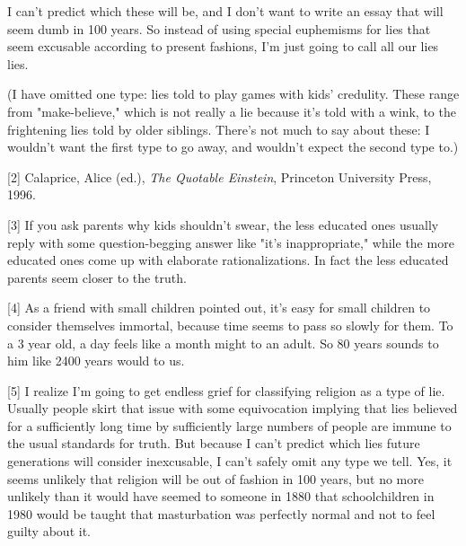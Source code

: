 I can't predict which these
                  will be, and I don't want to write an essay that will seem
                  dumb in 100 years. So instead of using special euphemisms for
                  lies that seem excusable according to present fashions, I'm
                  just going to call all our lies lies.

(I have
                  omitted one type: lies told to play games with kids'
                  credulity. These range from "make-believe," which is not
                  really a lie because it's told with a wink, to the frightening
                  lies told by older siblings. There's not much to say about
                  these: I wouldn't want the first type to go away, and wouldn't
                  expect the second type to.)

[2] Calaprice, Alice (ed.), \emph{The Quotable Einstein},
                  Princeton University Press, 1996.

[3] If you ask parents why kids shouldn't swear, the less
                  educated ones usually reply with some question-begging answer
                  like "it's inappropriate," while the more educated ones come
                  up with elaborate rationalizations. In fact the less educated
                  parents seem closer to the truth.

[4] As a friend with small children pointed out, it's easy for
                  small children to consider themselves immortal, because time
                  seems to pass so slowly for them. To a 3 year old, a day feels
                  like a month might to an adult. So 80 years sounds to him like
                  2400 years would to us.

[5] I realize I'm going to get endless grief for classifying
                  religion as a type of lie. Usually people skirt that issue
                  with some equivocation implying that lies believed for a
                  sufficiently long time by sufficiently large numbers of people
                  are immune to the usual standards for truth. But because I
                  can't predict which lies future generations will consider
                  inexcusable, I can't safely omit any type we tell. Yes, it
                  seems unlikely that religion will be out of fashion in 100
                  years, but no more unlikely than it would have seemed to
                  someone in 1880 that schoolchildren in 1980 would be taught
                  that masturbation was perfectly normal and not to feel guilty
                  about it.

